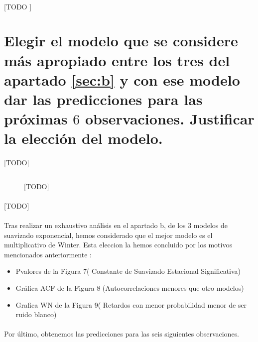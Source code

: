 \documentclass[a4paper, spanish]{article}
\begin{document}
    \paragraph{}
    [TODO ]

  \section{Elegir el modelo que se considere más apropiado entre los tres del apartado \ref{sec:b} y con ese modelo dar las predicciones para las próximas $6$ observaciones. Justificar la elección del modelo.}
  \label{sec:c}

    \paragraph{}
    [TODO]

    \begin{figure}[h!]
      \centering
      \inputminted{SAS}{./res/code/c-01-prediction.sas}
      \caption{[TODO]}
      \label{code:c_prediction}
    \end{figure}

    \paragraph{}
    [TODO]

    \paragraph{}
    Tras realizar un exhaustivo análisis en el apartado b, de los 3 modelos de suavizado exponencial, hemos considerado que el mejor modelo es el multiplicativo de Winter.
    Esta eleccion la hemos concluido por los motivos mencionados anteriormente :

    \begin{itemize}
      \item Pvalores de la Figura 7( Constante de Suavizado Estacional Significativa)
      \item Gráfica ACF de la Figura 8 (Autocorrelaciones menores que otro modelos)
      \item Grafica WN de la Figura 9( Retardos con menor probabilidad menor de ser ruido blanco)
    \end{itemize}

    \paragraph{}
    Por último, obtenemos las predicciones para las seis siguientes observaciones.
\end{document}
